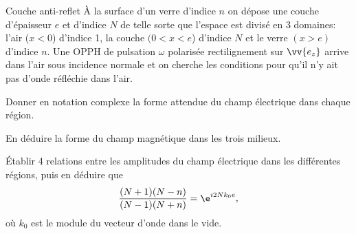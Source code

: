 \begin{exo}[PC][2][TD]{Couche anti-reflet}
À la surface d'un verre d'indice $n$ on dépose une couche d'épaisseur $e$ et d'indice $N$ de telle sorte que l'espace est divisé en 3 domaines: l'air ($x<0$) d'indice 1, la couche $(0<x<e$) d'indice $N$ et le verre $(x>e)$ d'indice $n$. Une OPPH de pulsation $\omega$ polarisée rectilignement sur $\vv{e_z}$ arrive dans l'air sous incidence normale et on cherche les conditions pour qu'il n'y ait pas d'onde réfléchie dans l'air.
 \begin{quest}
\item Donner en notation complexe la forme attendue du champ électrique dans chaque région.
\item En déduire la forme du champ magnétique dans les trois milieux.
\item Établir 4 relations entre les amplitudes du champ électrique dans les différentes régions, puis en déduire que
\begin{equation*}
\frac{(N+1)(N-n)}{(N-1)(N+n)}=\e^{i2Nk_{0}e},
\end{equation*}
où $k_{0}$ est le module du vecteur d'onde dans le vide.
\end{quest}
\end{exo}
